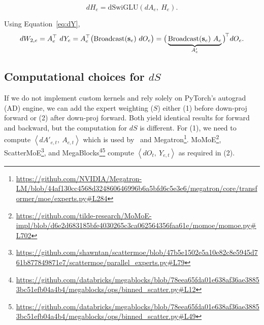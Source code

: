 \begin{equation}
    dH_e=\mathrm{dSwiGLU}(dA_{e},\ H_e).
\end{equation}

Using Equation~\ref{eq:dY},
\begin{equation}
    dW_{2,e}=A_{e}^{\top}\ dY_{e}
        =A_{e}^{\top}\big(\mathrm{Broadcast}(\vs_e)\ dO_{e}\big)
        =\big(\underbrace{\mathrm{Broadcast}(\vs_e)\ A_{e}}_{A'_{e}}\big)^{\!\top} dO_{e}.
\end{equation}



\subsection{Computational choices for $dS$} \label{sec:appendix:dS_computation}
If we do not implement custom kernels and rely solely on PyTorch's autograd (AD) engine, we can add the expert weighting ($S$) either (1) before down-proj forward or (2) after down-proj forward. Both yield identical results for forward and backward, but the computation for $dS$ is different. For (1), we need to compute $\left\langle dA'_{e,t},\ A_{e,t}\right\rangle$ which is used by \Algname~and Megatron\footnote{\scriptsize \url{https://github.com/NVIDIA/Megatron-LM/blob/44af130cc4568d324860646996b6a5bfd6c5e3e6/megatron/core/transformer/moe/experts.py\#L284}}. MoMoE\footnote{\scriptsize \url{https://github.com/tilde-research/MoMoE-impl/blob/d6e2d683185bfe4030265c3ca062564356faa61e/momoe/momoe.py\#L702}}, ScatterMoE\footnote{\scriptsize \url{https://github.com/shawntan/scattermoe/blob/47b5e1502e5a10e82c8e5945d761b877849871e7/scattermoe/parallel_experts.py\#L79}}, and MegaBlocks\footnote{\scriptsize \url{https://github.com/databricks/megablocks/blob/78eea65fda01e638af36ae38853bc51efb04a4b4/megablocks/ops/binned_scatter.py\#L12}}\footnote{\scriptsize \url{https://github.com/databricks/megablocks/blob/78eea65fda01e638af36ae38853bc51efb04a4b4/megablocks/ops/binned_scatter.py\#L49}} compute $\left\langle dO_t,\ Y_{e,t}\right\rangle$ as required in (2).




